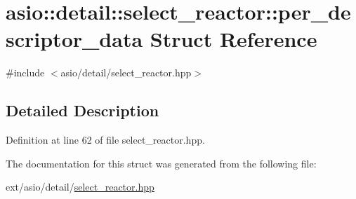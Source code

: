 \hypertarget{structasio_1_1detail_1_1select__reactor_1_1per__descriptor__data}{}\section{asio\+:\+:detail\+:\+:select\+\_\+reactor\+:\+:per\+\_\+descriptor\+\_\+data Struct Reference}
\label{structasio_1_1detail_1_1select__reactor_1_1per__descriptor__data}


{\ttfamily \#include $<$asio/detail/select\+\_\+reactor.\+hpp$>$}



\subsection{Detailed Description}


Definition at line 62 of file select\+\_\+reactor.\+hpp.



The documentation for this struct was generated from the following file\+:\begin{DoxyCompactItemize}
\item 
ext/asio/detail/\hyperlink{select__reactor_8hpp}{select\+\_\+reactor.\+hpp}\end{DoxyCompactItemize}

